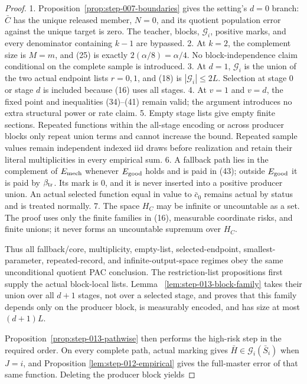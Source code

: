 \begin{proof}
1. Proposition~\ref{prop:step-007-boundaries} gives the setting's
   \(d=0\) branch: \(\bar C\) has the unique released member, \(N=0\), and
   its quotient population error against the unique target is zero. The
   teacher, blocks, \(\mathcal G_i\), positive marks, and every denominator
   containing \(k-1\) are bypassed.
2. At \(k=2\), the complement size is \(M=m\), and (25) is exactly
   \(2(\alpha/8)=\alpha/4\). No block-independence claim conditional on the
   complete sample is introduced.
3. At \(d=1\), \(\mathcal G_i\) is the union of the two actual endpoint
   lists \(r=0,1\), and (18) is \(|\mathcal G_i|\leq2L\). Selection at
   stage \(0\) or stage \(d\) is included because (16) uses all stages.
4. At \(v=1\) and \(v=d\), the  fixed point and inequalities
   (34)--(41) remain valid; the argument introduces no extra structural power
   or rate claim.
5. Empty stage lists give empty finite sections. Repeated functions within
   the all-stage encoding or across producer blocks only repeat union terms
   and cannot increase the bound. Repeated sample values remain independent
   indexed iid draws before realization and retain their literal
   multiplicities in every empirical sum.
6. A fallback path lies in the complement of \(E_{\rm mech}\) whenever
   \(E_{\rm good}\) holds and is paid in (43); outside
   \(E_{\rm good}\) it is paid by \(\beta_{\rm tr}\). Its mark is \(0\),
   and it is never inserted into a positive producer union. An actual
   selected function equal in value to \(\bar c_0\) remains actual by
   status and is treated normally.
7. The space \(H_C\) may be infinite or uncountable as a set. The proof
   uses only the finite families in (16), measurable coordinate risks, and
   finite unions; it never forms an uncountable supremum over \(H_C\).

Thus all fallback/core, multiplicity, empty-list, selected-endpoint,
smallest-parameter, repeated-record, and infinite-output-space regimes obey
the same unconditional quotient PAC conclusion. 
The restriction-list propositions first supply the actual block-local lists.
Lemma
~\ref{lem:step-013-block-family} takes their union over all \(d+1\) stages,
not over a selected stage, and proves that this family depends only on the
producer block, is measurably encoded, and has size at most \((d+1)L\).

Proposition~\ref{prop:step-013-pathwise} then performs the high-risk step in
the required order. On every complete path,  actual marking gives
\(\bar H\in\mathcal G_i(\bar S_i)\) when \(J=i\), and Proposition
\ref{lem:step-012-empirical} gives the full-master error of that same
function. Deleting the producer
block yields


\end{proof}
